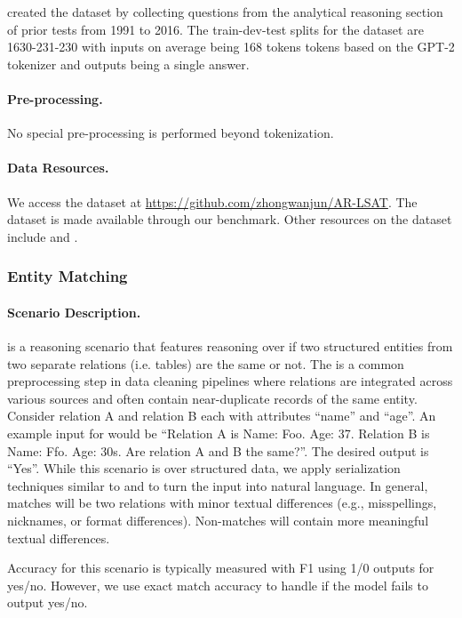 \citet{zhong2021arlsat} created the dataset by collecting questions from the analytical reasoning section of prior tests from 1991 to 2016. The train-dev-test splits for the dataset are 1630-231-230 with inputs on average being 168 tokens tokens based on the GPT-2 tokenizer and outputs being a single answer.

\paragraph{Pre-processing.} No special pre-processing is performed beyond tokenization.

\paragraph{Data Resources.} We access the dataset at \url{https://github.com/zhongwanjun/AR-LSAT}. The dataset is made available through our benchmark. Other resources on the dataset include \citep{wang2022lsat} and \citep{wang2022lsat}. 

\subsubsection{Entity Matching}
\paragraph{Scenario Description.}
\entmatch\citep{konda2016magellan, li2020deep} is a reasoning scenario that features reasoning over if two structured entities from two separate relations (i.e. tables) are the same or not. The is a common preprocessing step in data cleaning pipelines where relations are integrated across various sources and often contain near-duplicate records of the same entity\citep{golshan2017data}. Consider relation A and relation B each with attributes ``name'' and ``age''. An example input for \entmatch would be ``Relation A is Name: Foo. Age: 37. Relation B is Name: Ffo. Age: 30s. Are relation A and B the same?''. The desired output is ``Yes''. While this scenario is over structured data, we apply serialization techniques similar to \citep{narayan2022can} and \citep{li2020deep} to turn the input into natural language. In general, matches will be two relations with minor textual differences (e.g., misspellings, nicknames, or format differences). Non-matches will contain more meaningful textual differences.

Accuracy for this scenario is typically measured with F1 using 1/0 outputs for yes/no. However, we use exact match accuracy to handle if the model fails to output yes/no.

